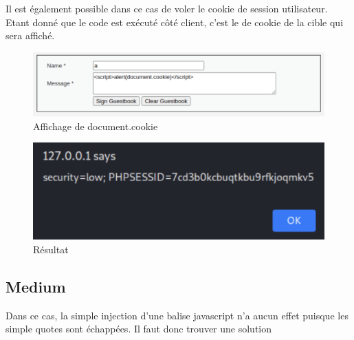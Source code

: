 \documentclass[12pt, oneside]{article}
\begin{document}
Il est également possible dans ce cas de voler le cookie de session utilisateur. Etant donné que le code est exécuté côté client, c'est le de cookie de la cible qui sera affiché.

\begin{figure}[H]
\centering
\includegraphics[scale=0.4]{15}
\caption{Affichage de document.cookie}
\end{figure}
\begin{figure}[H]
\centering
\includegraphics[scale=0.4]{16}
\caption{Résultat}
\end{figure}

\subsection{Medium}
Dans ce cas, la simple injection d'une balise javascript n'a aucun effet puisque les simple quotes sont échappées. Il faut donc trouver une solution 
\end{document}
